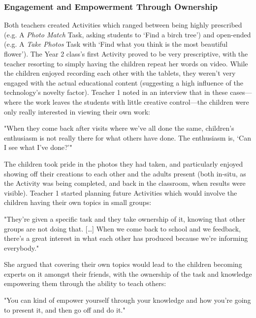 \subsubsection{Engagement and Empowerment Through Ownership}

Both teachers created Activities which ranged between being highly prescribed (e.g. A \textit{Photo Match} Task, asking students to ‘Find a birch tree’) and open-ended (e.g. A \textit{Take Photos} Task with ‘Find what you think is the most beautiful flower’). The Year 2 class's first Activity proved to be very prescriptive, with the teacher resorting to simply having the children repeat her words on video. While the children enjoyed recording each other with the tablets, they weren't very engaged with the actual educational content (suggesting a high influence of the technology’s novelty factor). Teacher 1 noted in an interview that in these cases---where the work leaves the students with little creative control---the children were only really interested in viewing their own work: 

\begin{displayquote}
"When they come back after visits where we've all done the same, children's enthusiasm is not really there for what others have done. The enthusiasm is, `Can I see what I've done?'"
\end{displayquote}

The children took pride in the photos they had taken, and particularly enjoyed showing off their creations to each other and the adults present (both in-situ, as the Activity was being completed, and back in the classroom, when results were visible). Teacher 1 started planning future Activities which would involve the children having their own topics in small groups: 

\begin{displayquote}
"They’re given a specific task and they take ownership of it, knowing that other groups are not doing that. […] When we come back to school and we feedback, there’s a great interest in what each other has produced because we’re informing everybody."
\end{displayquote}

She argued that covering their own topics would lead to the children becoming experts on it amongst their friends, with the ownership of the task and knowledge empowering them through the ability to teach others:

\begin{displayquote}
"You can kind of empower yourself through your knowledge and how you’re going to present it, and then go off and do it."
\end{displayquote}


